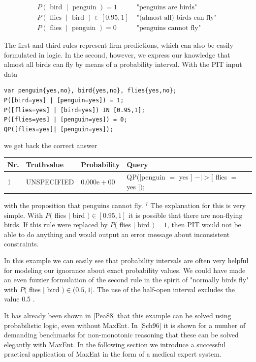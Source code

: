 \documentclass[10pt]{article}
\begin{document}
$$
\begin{array}{ll}
P(\text { bird } \mid \text { penguin })=1 & \text { "penguins are birds" } \\
P(\text { flies } \mid \text { bird }) \in[0.95,1] & \text { "(almost all) birds can fly" } \\
P(\text { flies } \mid \text { penguin })=0 & \text { "penguins cannot fly" }
\end{array}
$$

The first and third rules represent firm predictions, which can also be easily formulated in logic. In the second, however, we express our knowledge that almost all birds can fly by means of a probability interval. With the PIT input data

\begin{verbatim}
var penguin{yes,no}, bird{yes,no}, flies{yes,no};
P([bird=yes] | [penguin=yes]) = 1;
P([flies=yes] | [bird=yes]) IN [0.95,1];
P([flies=yes] | [penguin=yes]) = 0;
QP([flies=yes]| [penguin=yes]);
\end{verbatim}

we get back the correct answer

\begin{center}
\begin{tabular}{llll}
\hline
Nr. & Truthvalue & Probability & Query \\
\hline
1 & UNSPECIFIED & $0.000 \mathrm{e}+00$ & QP([penguin $=$ yes ] $-\mid>[$ flies $=$ yes $]) ;$ \\
\hline
\end{tabular}
\end{center}

with the proposition that penguins cannot fly. ${ }^{7}$ The explanation for this is very simple. With $P($ flies $\mid$ bird $) \in[0.95,1]$ it is possible that there are non-flying birds. If this rule were replaced by $P($ flies $\mid$ bird $)=1$, then PIT would not be able to do anything and would output an error message about inconsistent constraints.

In this example we can easily see that probability intervals are often very helpful for modeling our ignorance about exact probability values. We could have made an even fuzzier formulation of the second rule in the spirit of "normally birds fly" with $P($ flies $\mid$ bird $) \in(0.5,1]$. The use of the half-open interval excludes the value 0.5 .

It has already been shown in [Pea88] that this example can be solved using probabilistic logic, even without MaxEnt. In [Sch96] it is shown for a number of demanding benchmarks for non-monotonic reasoning that these can be solved elegantly with MaxEnt. In the following section we introduce a successful practical application of MaxEnt in the form of a medical expert system.
\end{document}

